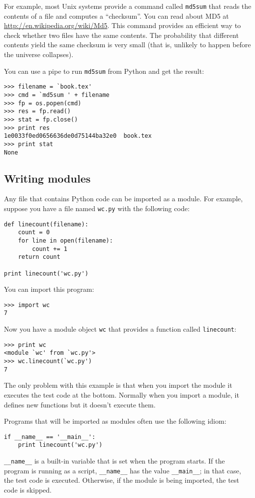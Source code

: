 \documentclass{article}
\begin{document}
\begin{multicols}{2}
For example, most Unix systems provide a command called \verb|md5sum| that
reads the contents of a file and computes a ``checksum''. You
can read about MD5 at \url{http://en.wikipedia.org/wiki/Md5}. This command
provides an efficient way to check whether two files have the same
contents. The probability that different contents yield the same
checksum is very small (that is, unlikely to happen before the
universe collapses).

You can use a pipe to run \verb|md5sum| from Python and get the result:
\begin{lstlisting}
>>> filename = `book.tex'
>>> cmd = `md5sum ' + filename
>>> fp = os.popen(cmd)
>>> res = fp.read()
>>> stat = fp.close()
>>> print res
1e0033f0ed0656636de0d75144ba32e0  book.tex
>>> print stat
None
\end{lstlisting}

\subsection{Writing modules} %
Any file that contains Python code can be imported as a module. For
example, suppose you have a file named \verb|wc.py| with the following
code:
\begin{lstlisting}
def linecount(filename):
    count = 0
    for line in open(filename):
        count += 1
    return count

print linecount('wc.py')
\end{lstlisting}
You can import this program:
\begin{lstlisting}
>>> import wc
7
\end{lstlisting}
Now you have a module object \verb|wc| that provides a function called
\verb|linecount|:
\begin{lstlisting}
>>> print wc
<module `wc' from `wc.py'>
>>> wc.linecount(`wc.py')
7
\end{lstlisting}
The only problem with this example is that when you import the module
it executes the test code at the bottom. Normally when you import a
module, it defines new functions but it doesn't execute them.

Programs that will be imported as modules often use the following
idiom:
\begin{lstlisting}
if __name__ == '__main__':
    print linecount('wc.py')
\end{lstlisting}
\verb|__name__| is a built-in variable that is set when the program
starts. If the program is running as a script, \verb|__name__| has the
value \verb|__main__|; in that case, the test code is executed.
Otherwise, if the module is being imported, the test code is skipped.


\end{multicols}
\end{document}
